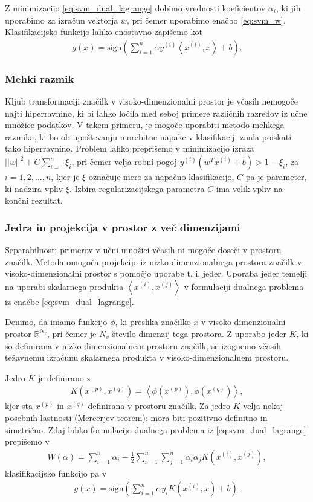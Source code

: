 \documentclass[11pt,a4paper,openany]{book}
\begin{document}
Z minimizacijo \ref{eq:svm_dual_lagrange} dobimo vrednosti koeficientov $\alpha_i$, ki jih uporabimo za izračun vektorja $w$, pri čemer uporabimo enačbo \ref{eq:svm_w}. Klasifikacijsko funkcijo lahko enostavno zapišemo kot
\begin{eqnarray}
	g(x) = \text{sign} \left(\sum^n_{i=1} \alpha y^{(i)} \left<x^{(i)},x\right> + b\right).
\end{eqnarray}

\subsubsection{Mehki razmik}
Kljub transformaciji značilk v visoko-dimenzionalni prostor je včasih nemogoče najti hiperravnino, ki bi lahko ločila med seboj primere različnih razredov iz učne množice podatkov. V takem primeru, je mogoče uporabiti metodo mehkega razmika, ki bo ob upoštevanju morebitne napake v klasifikaciji znala poiskati tako hiperravnino. Problem lahko preprišemo v minimizacijo izraza $||w||^2 + C\sum^n_{i=1}\xi_i$, pri čemer velja robni pogoj $y^{(i)}(w^Tx^{(i)} + b) > 1 - \xi_i$, za $i = 1, 2, ..., n$, kjer je $\xi$ označuje mero za napačno klasifikacijo, $C$ pa je parameter, ki nadzira vpliv $\xi$. Izbira regularizacijskega parametra $C$ ima velik vpliv na končni rezultat.

\subsubsection{Jedra in projekcija v prostor z več dimenzijami}
Separabilnosti primerov v učni množici včasih ni mogoče doseči v prostoru značilk. Metoda omogoča projekcijo iz nizko-dimenzionalnega prostora značilk v visoko-dimenzionalni prostor s pomočjo uporabe t. i. jeder. Uporaba jeder temelji na uporabi skalarnega produkta $\left<x^{(i)}, x^{(j)}\right>$ v formulaciji dualnega problema iz enačbe \ref{eq:svm_dual_lagrange}. 

Denimo, da imamo funkcijo $\phi$, ki preslika značilko $x$ v visoko-dimenzionalni prostor $\mathbb{R}^{N_v}$, pri čemer je $N_v$ število dimenzij tega prostora. Z uporabo jeder $K$, ki so definirana v nizko-dimenzionalnem prostoru značilk, se izognemo včasih težavnemu izračunu skalarnega produkta v visoko-dimenzionalnem prostoru.

Jedro $K$ je definirano z
\begin{eqnarray}
	K(x^{(p)}, x^{(q)}) = \left<\phi(x^{(p)}), \phi(x^{(q)})\right>,
\end{eqnarray}
kjer sta $x^{(p)}$ in $x^{(q)}$ definirana v prostoru značilk. Za jedro $K$ velja nekaj posebnih lastnosti (Mercerjev teorem): mora biti pozitivno definitno in simetrično. Zdaj lahko formulacijo dualnega problema iz \ref{eq:svm_dual_lagrange} prepišemo v 
\begin{eqnarray}
	W(\alpha) = \sum^n_{i = 1}\alpha_i - \frac{1}{2} \sum^n_{i=1} \sum^n_{j=1} \alpha_i \alpha_j K(x^{(i)}, x^{(j)}),
\end{eqnarray}
klasifikacijsko funkcijo pa v
\begin{eqnarray}
	g(x) = \text{sign} \left(\sum^n_{i=1}\alpha y_i K(x^{(i)}, x) + b \right).
\end{eqnarray}
\end{document}
